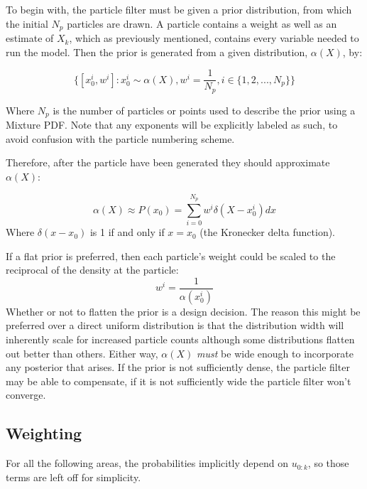 To begin with, the particle filter must be given a prior distribution, from
which the initial $N_p$ particles are drawn. A particle contains a weight
as well as an estimate of $X_k$, which as previously mentioned, contains every
variable needed to run the model. Then the prior is generated from a 
given distribution, $\alpha(X)$, by:

\begin{equation}
\{[x^i_0,w^i] : x^i_0 \sim \alpha(X), w^i = \frac{1}{N_p}, i \in \{1, 2, ... , N_p\} \}
\end{equation}

Where $N_p$ is the number of particles or points used to describe the prior 
using a Mixture PDF. 
Note that any exponents will be explicitly labeled as such, to avoid confusion with
the particle numbering scheme. 

Therefore, after the particle have been generated they should approximate $\alpha(X)$:

\begin{equation}
\alpha(X) \approx P(x_0) = \sum_{i=0}^{N_p} w^i\delta(X - x^i_0 ) dx
\end{equation}
Where $\delta(x-x_0)$ is 1 if and only if $x = x_0$ (the Kronecker delta function).

If a flat prior is 
preferred, then each particle's weight could be scaled to the reciprocal of the
density at the particle: 
\begin{equation}
w^i = \frac{1}{\alpha(x^i_0)}
\end{equation}
Whether or not to flatten the prior is a design decision. The reason this might 
be preferred over a direct
uniform distribution is that the distribution width will inherently scale 
for increased particle counts although some distributions
flatten out better than others. Either way, $\alpha(X)$ \emph{must} be
wide enough to incorporate any posterior that arises. If the prior is
not sufficiently dense, the particle filter may be able to compensate, if it is
not sufficiently wide the particle filter won't converge. 

\subsection{Weighting}
For all the following areas, the probabilities implicitly depend on $u_{0:k}$, 
so those terms are left off for simplicity.


